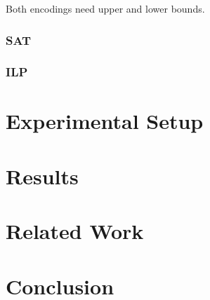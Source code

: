 \documentclass{sig-alternate}
\begin{document}
Both encodings need upper and lower bounds.

\subsubsection*{SAT}
\subsubsection*{ILP}

\section{Experimental Setup}

\section{Results}

\section{Related Work}

\cite{alves2013resource}
\cite{abio2014encoding}
\cite{wu2013exploiting}
\cite{velev2009exploiting}
\cite{horbach2010boolean}
\cite{klein1999computing}
\cite{mingozzi1998exact}
\cite{sharma2011polynomial}
\cite{ramani2004breaking}
\cite{schutt2011explaining}
\cite{wille2008using}
\cite{malaguti2010survey}
\cite{cs395tGCtoSAT}

\section{Conclusion}



\end{document}
